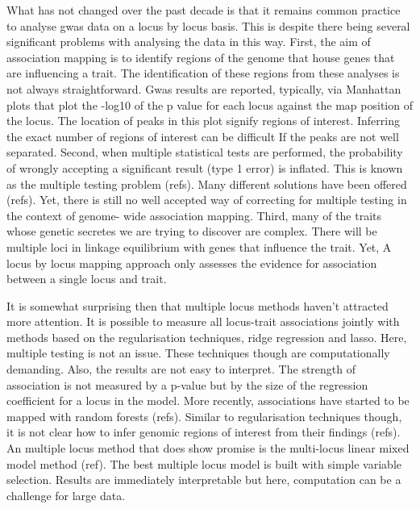 \documentclass[12pt]{article}
\begin{document}
What has not changed over the past decade is that it remains common practice to analyse gwas data on a locus by locus basis. This is despite there being several significant problems with analysing the data in this way. First, the aim of association mapping is to identify regions of the genome that house genes that are influencing a trait. The identification of these regions from these analyses is not always straightforward. Gwas results are reported, typically, via Manhattan plots that plot the -log10 of the p value for each locus against the map position of the locus. The location of peaks in this plot signify regions of interest. Inferring the exact number of regions of interest can be difficult If the peaks are not well separated. Second, when multiple statistical tests are performed, the probability of wrongly accepting a significant result (type 1 error) is inflated. This is known as the multiple testing problem (refs). Many different solutions have been offered (refs). Yet, there is still no well accepted way of correcting for multiple testing in the context of genome- wide association mapping. Third, many of the traits whose genetic secretes we are trying to discover are complex. There will be multiple loci in linkage equilibrium with genes that influence the trait. Yet, A locus by locus mapping approach only assesses the evidence for association between a single locus and trait.

It is somewhat surprising then that multiple locus methods haven't attracted more attention. It is possible to measure all locus-trait associations jointly with methods based on the regularisation techniques, ridge regression and lasso. Here, multiple testing is not an issue. These techniques though are computationally demanding. Also, the results are not easy to interpret. The strength of association is not measured by a p-value but by the size of the regression coefficient for a locus in the model. More recently, associations have started to be mapped with random forests (refs). Similar to regularisation techniques though, it is not clear how to infer genomic regions of interest from their findings (refs). An multiple locus method that does show promise is the multi-locus linear mixed model method (ref). The best multiple locus model is built with simple variable selection. Results are immediately interpretable but here, computation can be a challenge for large data.
\end{document}
